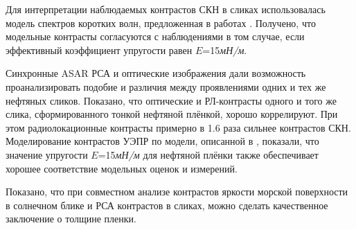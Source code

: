 Для интерпретации наблюдаемых контрастов СКН в сликах использовалась модель спектров коротких волн, предложенная в работах \citep{Kudryavtsev2005, 2008}. Получено, что модельные контрасты согласуются с наблюдениями в том случае, если эффективный коэффициент упругости равен $E$=15\textit{мН/м}.

Синхронные ASAR РСА и оптические изображения дали возможность проанализировать подобие и различия между проявлениями одних и тех же нефтяных сликов. Показано, что оптические и РЛ-контрасты одного и того же слика, сформированного тонкой нефтяной плёнкой, хорошо коррелируют. При этом радиолокационные контрасты примерно в 1.6 раза сильнее контрастов СКН. Моделирование контрастов УЭПР по модели, описанной в \citep{2008}, показали, что значение упругости $E$=15\textit{мН/м} для нефтяной плёнки также обеспечивает хорошее соответствие модельных оценок и измерений.

Показано, что при совместном анализе контрастов яркости морской поверхности в солнечном блике и РСА контрастов в сликах, можно сделать качественное заключение о толщине пленки.



\clearpage